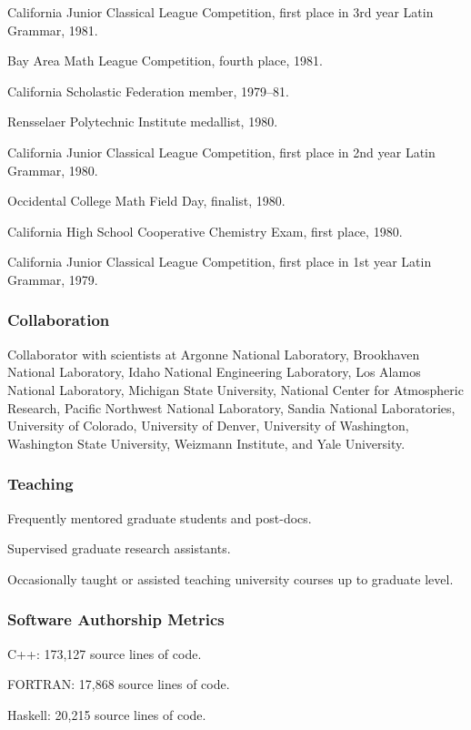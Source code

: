 \documentclass[]{article}
\begin{document}
California Junior Classical League Competition, first place in 3rd year
Latin Grammar, 1981.

Bay Area Math League Competition, fourth place, 1981.

California Scholastic Federation member, 1979--81.

Rensselaer Polytechnic Institute medallist, 1980.

California Junior Classical League Competition, first place in 2nd year
Latin Grammar, 1980.

Occidental College Math Field Day, finalist, 1980.

California High School Cooperative Chemistry Exam, first place, 1980.

California Junior Classical League Competition, first place in 1st year
Latin Grammar, 1979.

\subsubsection{Collaboration}\label{collaboration}

Collaborator with scientists at Argonne National Laboratory, Brookhaven
National Laboratory, Idaho National Engineering Laboratory, Los Alamos
National Laboratory, Michigan State University, National Center for
Atmospheric Research, Pacific Northwest National Laboratory, Sandia
National Laboratories, University of Colorado, University of Denver,
University of Washington, Washington State University, Weizmann
Institute, and Yale University.

\subsubsection{Teaching}\label{teaching}

Frequently mentored graduate students and post-docs.

Supervised graduate research assistants.

Occasionally taught or assisted teaching university courses up to
graduate level.

\subsubsection{Software Authorship
Metrics}\label{software-authorship-metrics}

C++: 173,127 source lines of code.

FORTRAN: 17,868 source lines of code.

Haskell: 20,215 source lines of code.
\end{document}
